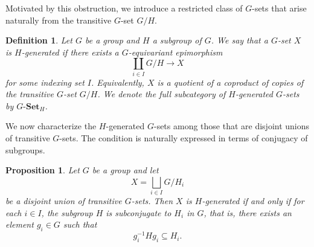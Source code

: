 \documentclass{amsart}
\newtheorem{proposition}{Proposition}
\newtheorem{definition}{Definition}
\begin{document}
Motivated by this obstruction, we introduce a restricted class of $G$-sets that arise naturally from the transitive $G$-set $G/H$.

\begin{definition}\label{def:H_generated}
Let $G$ be a group and $H$ a subgroup of $G$. We say that a $G$-set $X$ is \emph{$H$-generated} if there exists a $G$-equivariant epimorphism
\[
\coprod_{i \in I} G/H \longrightarrow X
\]
for some indexing set $I$. Equivalently, $X$ is a quotient of a coproduct of copies of the transitive $G$-set $G/H$. We denote the full subcategory of $H$-generated $G$-sets by $G\text{-}\mathbf{Set}_H$.
\end{definition}

 

We now characterize the $H$-generated $G$-sets among those that are disjoint unions of transitive $G$-sets. The condition is naturally expressed in terms of conjugacy of subgroups.

\begin{proposition}\label{prop:H_generated_criterion}
Let $G$ be a group and let
\[
X = \bigsqcup_{i \in I} G/H_i
\]
be a disjoint union of transitive $G$-sets. Then $X$ is $H$-generated if and only if for each $i \in I$, the subgroup $H$ is subconjugate to $H_i$ in $G$, that is, there exists an element $g_i \in G$ such that
\[
g_i^{-1} H g_i \subseteq H_i.
\]
\end{proposition}
\end{document}

